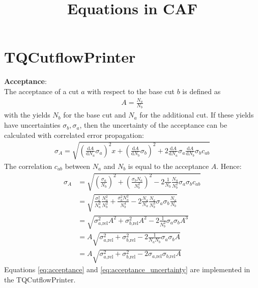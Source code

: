 \documentclass{article}
\title{Equations in CAF}
\date{}
\newcommand{\D}[1]{\ensuremath{\text{d}#1}}
\begin{document}
\maketitle
\section{TQCutflowPrinter}
{\bf Acceptance}:\\
The acceptance of a cut $a$ with respect to the base cut $b$ is defined as
\begin{align}
  A=\frac{N_a}{N_b}
\label{eq:acceptance}
\end{align}
with the yields $N_b$ for the base cut and $N_a$ for the additional cut. If these yields have uncertainties $\sigma_b, \sigma_a$, then the uncertainty of the acceptance can be calculated with correlated error propagation:
\begin{align*}
  \sigma_A = \sqrt{\left(\frac{\D A}{\D N_a}\sigma_a\right)^2x + \left(\frac{\D A}{\D N_b}\sigma_b\right)^2 + 2 \frac{\D A}{\D N_a}\sigma_a \frac{\D A}{\D N_b}\sigma_bc_{ab}}
\end{align*}
The correlation $c_{ab}$ between $N_a$ and $N_b$ is equal to the acceptance $A$. Hence:
\begin{align}
  \sigma_A &= \sqrt{\left(\frac{\sigma_a}{N_b}\right)^2 + \left(\frac{\sigma_bN_a}{N_b^2}\right)^2 - 2\frac{1}{N_b}\frac{N_a}{N_b^2}\sigma_a\sigma_bc_{ab}}\nonumber\\
  &=\sqrt{\frac{\sigma_a^2}{N_a^2}\frac{N_a^2}{N_b^2} + \frac{\sigma_b^2N_a^2}{N_b^4} - 2\frac{N_a}{N_a}\frac{N_a}{N_b^3}\sigma_a\sigma_b\frac{N_a}{N_b}}\nonumber\\
  &=\sqrt{\sigma_{a\text{,rel}}^2 A^2 + \sigma_{b\text{,rel}}^2 A^2 - 2\frac{1}{N_b^2}\sigma_a\sigma_bA^3}\nonumber\\
  &=A\sqrt{\sigma_{a\text{,rel}}^2 + \sigma_{b\text{,rel}}^2 - 2\frac{1}{N_aN_b}\sigma_a\sigma_bA}\nonumber\\
  &=A\sqrt{\sigma_{a\text{,rel}}^2 + \sigma_{b\text{,rel}}^2 - 2\sigma_{a\text{,rel}}\sigma_{b\text{,rel}}A}
    \label{eq:acceptance_uncertainty}
\end{align}
Equations \eqref{eq:acceptance} and \eqref{eq:acceptance_uncertainty} are implemented in the TQCutflowPrinter.
\end{document}
